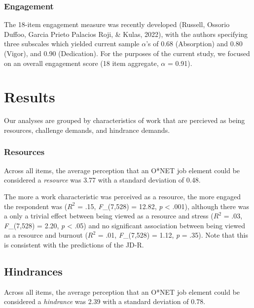 \documentclass[
  english,
  man]{apa6}
\begin{document}
\hypertarget{engagement}{%
\subsubsection{Engagement}\label{engagement}}

The 18-item engagement measure was recently developed (Russell, Ossorio Duffoo, Garcia Prieto Palacios Roji, \& Kulas, 2022), with the authors specifying three subscales which yielded current sample \(\alpha\)'s of 0.68 (Absorption) and 0.80 (Vigor), and 0.90 (Dedication). For the purposes of the current study, we focused on an overall engagement score (18 item aggregate, \(\alpha\) = 0.91).

\hypertarget{results-1}{%
\section{Results}\label{results-1}}

Our analyses are grouped by characteristics of work that are percieved as being resources, challenge demands, and hindrance demands.

\hypertarget{resources}{%
\subsubsection{Resources}\label{resources}}

Across all items, the average perception that an O*NET job element could be considered a \emph{resource} was 3.77 with a standard deviation of 0.48.

The more a work characteristic was perceived as a resource, the more engaged the respondent was (\(R^2\) = .15, \emph{F}\_(7,528) = 12.82, \emph{p} \textless{} .001), although there was a only a trivial effect between being viewed as a resource and stress (\(R^2\) = .03, \emph{F}\_(7,528) = 2.20, \emph{p} \textless{} .05) and no significant association between being viewed as a resource and burnout (\(R^2\) = .01, \emph{F}\_(7,528) = 1.12, \emph{p} = .35). Note that this is consistent with the predictions of the JD-R.

\hypertarget{hindrances}{%
\subsection{Hindrances}\label{hindrances}}

Across all items, the average perception that an O*NET job element could be considered a \emph{hindrance} was 2.39 with a standard deviation of 0.78.
\end{document}
